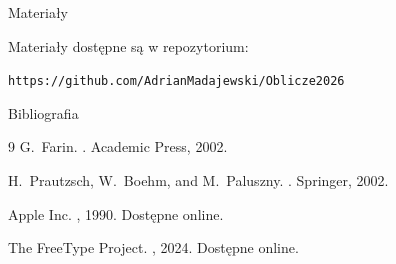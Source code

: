 \documentclass[xcolor=dvipsnames]{beamer}
\begin{document}
\begin{frame}{Materiały}
	
	\begin{center}
		Materiały dostępne są w repozytorium:
	\end{center}
	
	\vspace{0.4cm}
	
	\begin{center}
		\texttt{\small https://github.com/AdrianMadajewski/Oblicze2026}
	\end{center}
	
	\vspace{0.8cm}
	
	\begin{center}
	\end{center}
	
\end{frame}

\begin{frame}[allowframebreaks]{Bibliografia}
	\small
	\begin{thebibliography}{9}		
		G.~Farin.
		.
		\newblock Academic Press, 2002.
		
		H.~Prautzsch, W.~Boehm, and M.~Paluszny.
		.
		\newblock Springer, 2002.
		
		
		Apple Inc.
		, 1990.
		\newblock Dostępne online.
		
		The FreeType Project.
		, 2024.
		\newblock Dostępne online.
		
		
		
	\end{thebibliography}
\end{frame}
\end{document}
